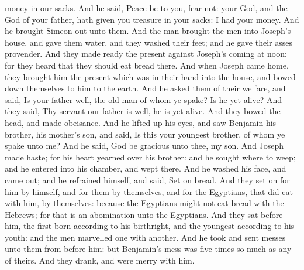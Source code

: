 money in our sacks. And he said, Peace be to you, fear not: your God, and the God of your father, hath given you treasure in your sacks: I had your money. And he brought Simeon out unto them. And the man brought the men into Joseph’s house, and gave them water, and they washed their feet; and he gave their asses provender. And they made ready the present against Joseph’s coming at noon: for they heard that they should eat bread there.  And when Joseph came home, they brought him the present which was in their hand into the house, and bowed down themselves to him to the earth. And he asked them of their welfare, and said, Is your father well, the old man of whom ye spake? Is he yet alive? And they said, Thy servant our father is well, he is yet alive. And they bowed the head, and made obeisance. And he lifted up his eyes, and saw Benjamin his brother, his mother’s son, and said, Is this your youngest brother, of whom ye spake unto me? And he said, God be gracious unto thee, my son. And Joseph made haste; for his heart yearned over his brother: and he sought where to weep; and he entered into his chamber, and wept there. And he washed his face, and came out; and he refrained himself, and said, Set on bread. And they set on for him by himself, and for them by themselves, and for the Egyptians, that did eat with him, by themselves: because the Egyptians might not eat bread with the Hebrews; for that is an abomination unto the Egyptians. And they sat before him, the first-born according to his birthright, and the youngest according to his youth: and the men marvelled one with another. And he took and sent messes unto them from before him: but Benjamin’s mess was five times so much as any of theirs. And they drank, and were merry with him. 

